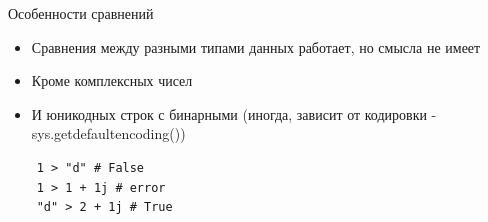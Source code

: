 \documentclass{article}
\begin{document}
\newpage

\begin{center} Особенности сравнений \end{center}
\begin{itemize}
	\item Сравнения между разными типами данных работает, но смысла не имеет
	\item Кроме комплексных чисел
	\item И юникодных строк с бинарными (иногда, зависит от кодировки - sys.getdefaultencoding())
\end{itemize}
\begin{lstlisting}
	1 > "d" # False
	1 > 1 + 1j # error
	"d" > 2 + 1j # True
\end{lstlisting}
\newpage

\end{document}
